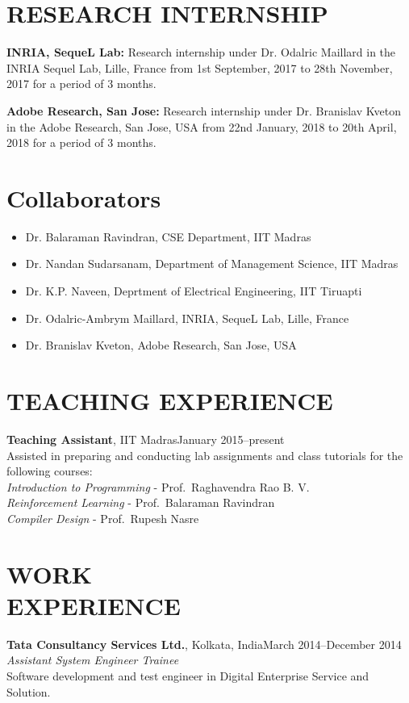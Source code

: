 \documentclass[margin,11pt]{res}
\begin{document}
\begin{resume}

\section{RESEARCH INTERNSHIP}
\textbf{INRIA, SequeL Lab:} Research internship under Dr. Odalric Maillard in the INRIA Sequel Lab, Lille, France from 1st September, 2017 to 28th November, 2017 for a period of 3 months.

\textbf{Adobe Research, San Jose:} Research internship under Dr. Branislav Kveton in the Adobe Research, San Jose, USA from 22nd January, 2018 to 20th April, 2018 for a period of 3 months.

\section{Collaborators}
\begin{itemize}
\item Dr. Balaraman Ravindran, CSE Department, IIT Madras
\item Dr. Nandan Sudarsanam, Department of Management Science, IIT Madras
\item Dr. K.P. Naveen, Deprtment of Electrical Engineering, IIT Tiruapti
\item Dr. Odalric-Ambrym Maillard, INRIA, SequeL Lab, Lille, France
\item Dr. Branislav Kveton, Adobe Research, San Jose, USA
\end{itemize}

\section{TEACHING EXPERIENCE}
\par
\textbf{Teaching Assistant}, IIT Madras\hfill January 2015--present\\
Assisted in preparing and conducting lab assignments and class tutorials for the following courses:\\
\textit{Introduction to Programming} - Prof.~Raghavendra Rao B. V. \\
\textit{Reinforcement Learning} - Prof.~Balaraman Ravindran\\
\textit{Compiler Design} - Prof.~Rupesh Nasre

\section{WORK\\EXPERIENCE}
\textbf{Tata Consultancy Services Ltd.}, Kolkata, India\hfill March 2014--December 2014\\
\textit{Assistant System Engineer Trainee}\\
Software development and test engineer in Digital Enterprise Service and Solution.


\end{resume}
\end{document}
